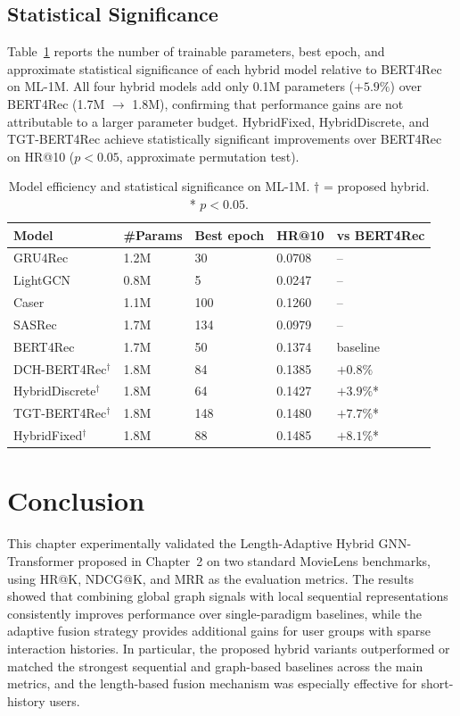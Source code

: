 \documentclass[12pt,a4paper]{report}
\begin{document}
\subsection*{Statistical Significance}

Table~\ref{tab:efficiency} reports the number of trainable parameters, best
epoch, and approximate statistical significance of each hybrid model relative
to BERT4Rec on ML-1M. All four hybrid models add only 0.1M parameters
(\(+5.9\%\)) over BERT4Rec (1.7M \(\rightarrow\) 1.8M), confirming that
performance gains are not attributable to a larger parameter budget.
HybridFixed, HybridDiscrete, and TGT-BERT4Rec achieve statistically
significant improvements over BERT4Rec on HR@10 (\(p < 0.05\), approximate
permutation test).

\begin{table}[h]
\centering
\caption{Model efficiency and statistical significance on ML-1M. \(\dagger\) = proposed hybrid. * \(p < 0.05\).}
\label{tab:efficiency}
\begin{tabular}{p{3.8cm} p{2cm} p{2cm} p{2.5cm} p{2.5cm}}
\toprule
\textbf{Model} & \textbf{\#Params} & \textbf{Best epoch} &
\textbf{HR@10} & \textbf{vs BERT4Rec} \\
\midrule
GRU4Rec              & 1.2M & 30  & 0.0708 & -- \\
LightGCN             & 0.8M & 5   & 0.0247 & -- \\
Caser                & 1.1M & 100 & 0.1260 & -- \\
SASRec               & 1.7M & 134 & 0.0979 & -- \\
BERT4Rec             & 1.7M & 50  & 0.1374 & baseline \\
DCH-BERT4Rec\(^\dagger\)   & 1.8M & 84  & 0.1385 & \(+0.8\%\) \\
HybridDiscrete\(^\dagger\) & 1.8M & 64  & 0.1427 & \(+3.9\%\)*  \\
TGT-BERT4Rec\(^\dagger\)   & 1.8M & 148 & 0.1480 & \(+7.7\%\)*  \\
HybridFixed\(^\dagger\)    & 1.8M & 88  & 0.1485 & \(+8.1\%\)*  \\
\bottomrule
\end{tabular}
\end{table}

\clearpage
\section{Conclusion}
\label{sec:ch3conclusion}

This chapter experimentally validated the Length-Adaptive Hybrid GNN-Transformer
proposed in Chapter~2 on two standard MovieLens benchmarks, using HR@K,
NDCG@K, and MRR as the evaluation metrics. The results showed that combining
global graph signals with local sequential representations consistently improves
performance over single-paradigm baselines, while the adaptive fusion strategy
provides additional gains for user groups with sparse interaction histories.
In particular, the proposed hybrid variants outperformed or matched the
strongest sequential and graph-based baselines across the main metrics, and the
length-based fusion mechanism was especially effective for short-history users.
\end{document}
